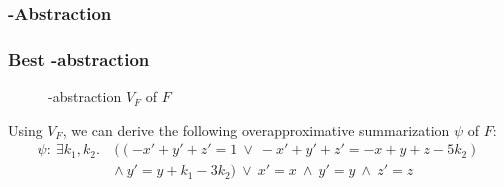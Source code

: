 \begin{frame}
	\frametitle{\qvasr-Abstraction}
\end{frame}

\begin{frame}[t]
	\frametitle{Best \qvasr-abstraction}
	\begin{center}
		\begin{figure}
			
			\caption*{\qvasr-abstraction $V_F$ of $F$}
		\end{figure}
	\end{center}
	\pause
	\begin{center}
	Using $V_F$, we can derive the following overapproximative summarization $\psi$ of $F$:
	\begin{align*}
	 \psi: \	\exists k_1, k_2.\ &((-x' + y' + z' = 1\ \lor\ -x' + y' + z' = -x + y + z - 5k_2)\ \\ &\land\ y' = y + k_1 - 3k_2)\ \lor\ x' = x\ \land\ y' = y\ \land\ z' = z
	\end{align*}
	\end{center}
\end{frame}